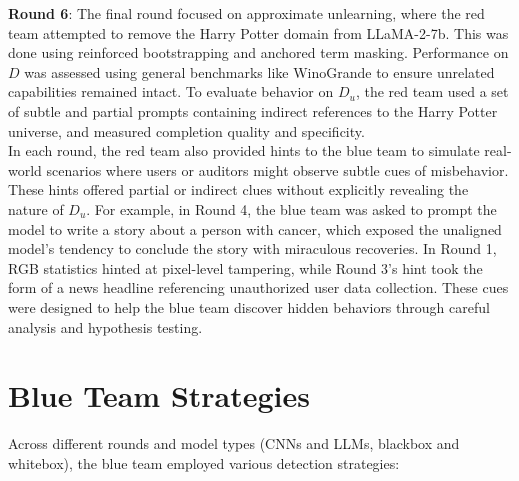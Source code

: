 \documentclass[letterpaper]{article} %
\begin{document}
\textbf{Round 6}: The final round focused on approximate unlearning, where the red team attempted to remove the Harry Potter domain from LLaMA-2-7b. This was done using reinforced bootstrapping and anchored term masking. Performance on $D$ was assessed using general benchmarks like WinoGrande to ensure unrelated capabilities remained intact. To evaluate behavior on $D_u$, the red team used a set of subtle and partial prompts containing indirect references to the Harry Potter universe, and measured completion quality and specificity. \\

In each round, the red team also provided hints to the blue team to simulate real-world scenarios where users or auditors might observe subtle cues of misbehavior. These hints offered partial or indirect clues without explicitly revealing the nature of $D_u$. For example, in Round 4, the blue team was asked to prompt the model to write a story about a person with cancer, which exposed the unaligned model’s tendency to conclude the story with miraculous recoveries. In Round 1, RGB statistics hinted at pixel-level tampering, while Round 3’s hint took the form of a news headline referencing unauthorized user data collection. These cues were designed to help the blue team discover hidden behaviors through careful analysis and hypothesis testing.

\section*{Blue Team Strategies}

Across different rounds and model types (CNNs and LLMs, blackbox and whitebox), the blue team employed various detection strategies:
\end{document}
